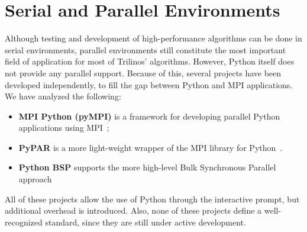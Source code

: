\documentclass[acmtocl]{acmtrans2m}
\begin{document}
\section{Serial and Parallel Environments}
\label{sec:serial}

Although testing and development of high-performance algorithms can be
done in serial environments, parallel environments still constitute
the most important field of application for most of Trilinos'
algorithms. However, Python itself does not provide any parallel
support. Because of this, several projects have been developed
independently, to fill the gap between Python and MPI applications. We
have analyzed the following:

\begin{itemize}

\item {\bf MPI Python (pyMPI)} is a framework for developing parallel
  Python applications using MPI~\cite{MPI-Python};

\item {\bf PyPAR} is a more light-weight wrapper of the MPI library
  for Python~\cite{pypar}.

\item {\bf Python BSP} supports the more high-level Bulk Synchronous
  Parallel approach~\cite{bsp}

\end{itemize}

All of these projects allow the use of Python through the interactive
prompt, but additional overhead is introduced. Also, none of these
projects define a well-recognized standard, since they are still
under active development.
\end{document}
